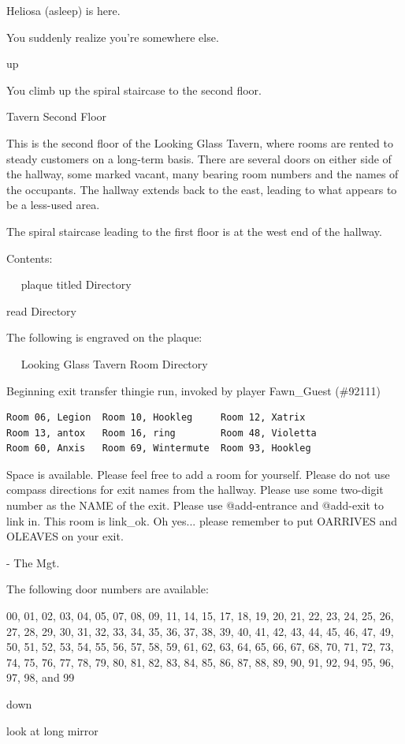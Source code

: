 \documentclass[10pt,twoside,openright]{memoir}
\begin{document}
{Heliosa (asleep) is here.

You suddenly realize you're somewhere else.

up

You climb up the spiral staircase to the second floor.

Tavern Second Floor

This is the second floor of the Looking Glass Tavern, where rooms are
rented to steady customers on a long-term basis.  There are several doors on
either side of the hallway, some marked vacant, many bearing room numbers and
the names of the occupants.  The hallway extends back to the east, leading
to what appears to be a less-used area.

The spiral staircase leading to the first floor is at the west end of the
 hallway.

Contents:

~ ~plaque titled Directory

read Directory

The following is engraved on the plaque:

~ ~Looking Glass Tavern Room Directory

Beginning exit transfer thingie run, invoked by player Fawn\_Guest (\#92111)

\begin{verbatim}
Room 06, Legion  Room 10, Hookleg     Room 12, Xatrix
Room 13, antox   Room 16, ring        Room 48, Violetta
Room 60, Anxis   Room 69, Wintermute  Room 93, Hookleg
\end{verbatim}

Space is available.  Please feel free to add a room for yourself.
Please do not use compass directions for exit names from the hallway.
Please use some two-digit number as the NAME of the exit.
Please use @add-entrance and @add-exit to link in.  This room is link\_ok.
Oh yes... please remember to put OARRIVES and OLEAVES on your exit.

- The Mgt.

The following door numbers are available:

00, 01, 02, 03, 04, 05, 07, 08, 09, 11, 14, 15, 17, 18, 19, 20, 21, 22, 23, 24, 25, 26, 27, 28, 29, 30, 31, 32, 33, 34, 35, 36, 37, 38, 39, 40, 41, 42, 43, 44, 45, 46, 47, 49, 50, 51, 52, 53, 54, 55, 56, 57, 58, 59, 61, 62, 63, 64, 65, 66, 67, 68, 70, 71, 72, 73, 74, 75, 76, 77, 78, 79, 80, 81, 82, 83, 84, 85, 86, 87, 88, 89, 90, 91, 92, 94, 95, 96, 97, 98, and 99

down

look at long mirror

}
\end{document}

